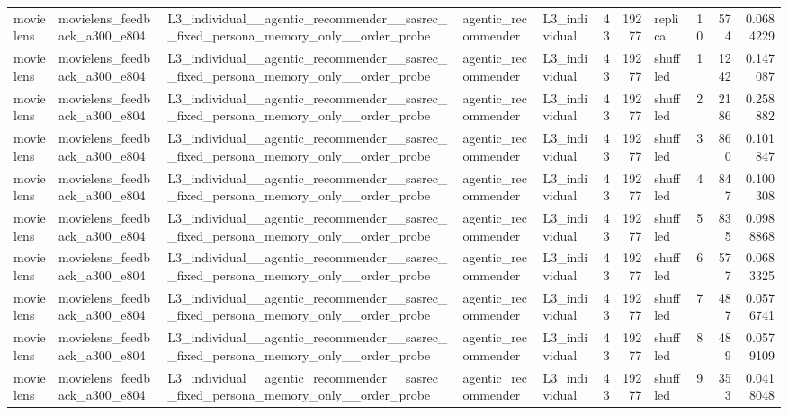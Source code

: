 \begin{table}[htbp!]
\begin{tabular}{lllllrrlrrr}
movielens & movielens\_feedback\_a300\_e804 & L3\_individual\_\_agentic\_recommender\_\_sasrec\_\_fixed\_persona\_memory\_only\_\_order\_probe & agentic\_recommender & L3\_individual & 43 & 19277 & replica & 10 & 574 & 0.0684229 \\
movielens & movielens\_feedback\_a300\_e804 & L3\_individual\_\_agentic\_recommender\_\_sasrec\_\_fixed\_persona\_memory\_only\_\_order\_probe & agentic\_recommender & L3\_individual & 43 & 19277 & shuffled & 1 & 1242 & 0.147087 \\
movielens & movielens\_feedback\_a300\_e804 & L3\_individual\_\_agentic\_recommender\_\_sasrec\_\_fixed\_persona\_memory\_only\_\_order\_probe & agentic\_recommender & L3\_individual & 43 & 19277 & shuffled & 2 & 2186 & 0.258882 \\
movielens & movielens\_feedback\_a300\_e804 & L3\_individual\_\_agentic\_recommender\_\_sasrec\_\_fixed\_persona\_memory\_only\_\_order\_probe & agentic\_recommender & L3\_individual & 43 & 19277 & shuffled & 3 & 860 & 0.101847 \\
movielens & movielens\_feedback\_a300\_e804 & L3\_individual\_\_agentic\_recommender\_\_sasrec\_\_fixed\_persona\_memory\_only\_\_order\_probe & agentic\_recommender & L3\_individual & 43 & 19277 & shuffled & 4 & 847 & 0.100308 \\
movielens & movielens\_feedback\_a300\_e804 & L3\_individual\_\_agentic\_recommender\_\_sasrec\_\_fixed\_persona\_memory\_only\_\_order\_probe & agentic\_recommender & L3\_individual & 43 & 19277 & shuffled & 5 & 835 & 0.0988868 \\
movielens & movielens\_feedback\_a300\_e804 & L3\_individual\_\_agentic\_recommender\_\_sasrec\_\_fixed\_persona\_memory\_only\_\_order\_probe & agentic\_recommender & L3\_individual & 43 & 19277 & shuffled & 6 & 577 & 0.0683325 \\
movielens & movielens\_feedback\_a300\_e804 & L3\_individual\_\_agentic\_recommender\_\_sasrec\_\_fixed\_persona\_memory\_only\_\_order\_probe & agentic\_recommender & L3\_individual & 43 & 19277 & shuffled & 7 & 487 & 0.0576741 \\
movielens & movielens\_feedback\_a300\_e804 & L3\_individual\_\_agentic\_recommender\_\_sasrec\_\_fixed\_persona\_memory\_only\_\_order\_probe & agentic\_recommender & L3\_individual & 43 & 19277 & shuffled & 8 & 489 & 0.0579109 \\
movielens & movielens\_feedback\_a300\_e804 & L3\_individual\_\_agentic\_recommender\_\_sasrec\_\_fixed\_persona\_memory\_only\_\_order\_probe & agentic\_recommender & L3\_individual & 43 & 19277 & shuffled & 9 & 353 & 0.0418048 \\

\end{tabular}
\end{table}
